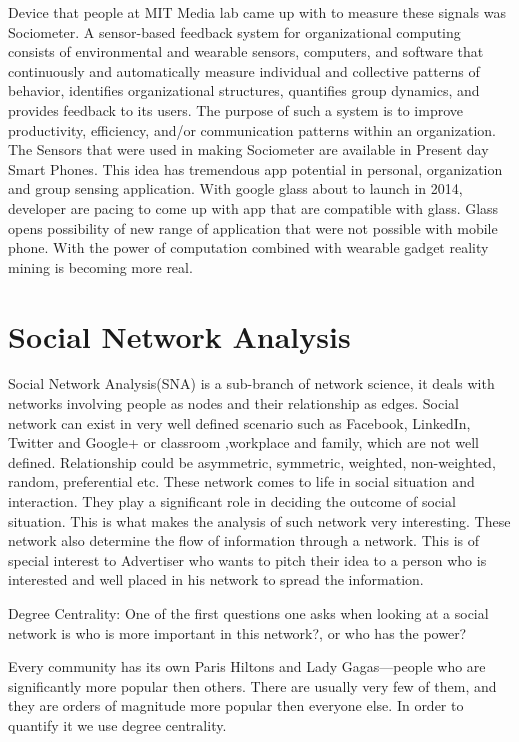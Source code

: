\documentclass[AER]{AEA}
\begin{document}
Device that people at MIT Media lab came up with to measure these signals was Sociometer. A sensor-based feedback system for organizational computing consists of environmental and wearable sensors, computers, and software that continuously and automatically measure individual and collective patterns of behavior, identifies organizational structures, quantifies group dynamics, 
and provides feedback to its users. The purpose of such a system is to improve productivity, efficiency, and/or communication patterns within an organization.
The Sensors that were used in making Sociometer are available in Present day Smart Phones. This idea has tremendous app potential in personal, organization and group sensing application. With google glass about to launch in 2014, developer are pacing to come up with app that are compatible with glass. Glass opens possibility of new range of application that were not possible with mobile phone. With the power of computation combined with wearable gadget reality mining is becoming more real.

\section{Social Network Analysis}
Social Network Analysis(SNA) is a sub-branch of network science, it deals with networks involving people as nodes and their relationship as edges. Social network can exist in very well defined scenario such as Facebook, LinkedIn, Twitter and Google+ or classroom ,workplace and family, which are not well defined. Relationship could be asymmetric, symmetric, weighted, non-weighted, random, preferential etc. These network comes to life in social situation and interaction. They play a significant role in deciding the outcome of social situation. This is what makes the analysis of such network very interesting.
	These network also determine the flow of information through a network. This is of special interest to Advertiser who wants to pitch their idea to a person who is interested and well placed in his network to spread the information.  


Degree Centrality:
	One of the first questions one asks when looking at a social network is who is more 
important in this network?, or who has the power? 

Every community has its own Paris Hiltons and Lady Gagas—people who are significantly more popular then others. There are usually very few of them, and they are orders 
of magnitude more popular then everyone else. In order to quantify it we use degree centrality. 
\end{document}
